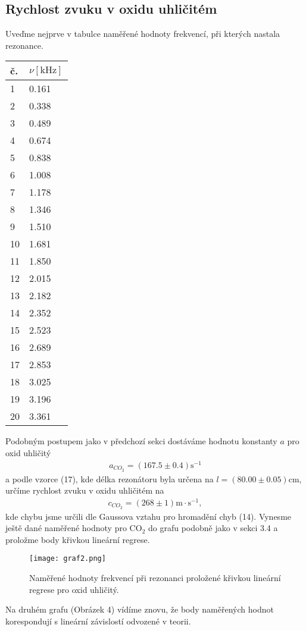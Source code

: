 \subsection{Rychlost zvuku v oxidu uhličitém}
\par Uveďme nejprve v tabulce naměřené hodnoty frekvencí, při kterých nastala rezonance.
\begin{center}
     \label{tab:title} 
    \begin{tabular}{| l | l |}
    \hline
     č. & $\nu [\mathrm{kHz}]$   \\ \hline
     \hline
    1  & 0.161  \\ \hline
    2  & 0.338 \\ \hline
    3 & 0.489\\ \hline
    4&0.674 \\ \hline
    5 &0.838\\ \hline
    6&1.008\\ \hline
    7&1.178\\ \hline
    8&1.346\\ \hline
    9&1.510\\ \hline
    10&1.681\\ \hline
    11&1.850\\ \hline
    12&2.015\\ \hline
    13 &2.182\\ \hline
    14&2.352\\ \hline
    15&2.523\\ \hline
    16&2.689\\ \hline
    17&2.853\\ \hline
    18&3.025\\ \hline
    19&3.196\\ \hline
    20&3.361\\ \hline
    \end{tabular}
\end{center}
\par Podobným postupem jako v předchozí sekci dostáváme hodnotu konstanty $a$ pro oxid uhličitý
\begin{align*}
        a_{CO_2} = (167.5 \pm 0.4) \mathrm{s^{-1}}
\end{align*}
a podle vzorce (17), kde délka rezonátoru byla určena na $l = (80.00 \pm 0.05)\mathrm{cm}$, určíme rychlost zvuku v oxidu uhličitém na
\begin{align*}
    c_{CO_2} = (268 \pm 1)\mathrm{m\cdot s^{-1}},
\end{align*}
kde chybu jsme určili dle Gaussova vztahu pro hromadění chyb (14).    
Vynesme ještě dané naměřené hodnoty pro $\mathrm{CO_2}$ do grafu podobně jako v sekci 3.4 a proložme body křivkou lineární regrese. 
\begin{figure}[h]
\centering
\texttt{[image: graf2.png]}
\caption{Naměřené hodnoty frekvencí při rezonanci proložené křivkou lineární regrese pro oxid uhličitý.}
\end{figure}
\par Na druhém grafu (Obrázek 4) vídíme znovu, že body naměřených hodnot korespondují s lineární závislostí odvozené v teorii.
